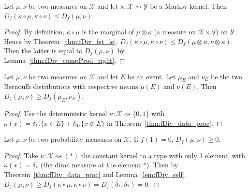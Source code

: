 \begin{theorem}
  \label{thm:fDiv_data_proc}
  Let $\mu, \nu$ be two measures on $\mathcal X$ and let $\kappa : \mathcal X \rightsquigarrow \mathcal Y$ be a Markov kernel.
  Then $D_f(\kappa \circ \mu, \kappa \circ \nu) \le D_f(\mu, \nu)$.
\end{theorem}

\begin{proof}
By definition, $\kappa \circ \mu$ is the marginal of $\mu \otimes \kappa$ (a measure on $\mathcal X \times \mathcal Y$) on $\mathcal Y$. Hence by Theorem~\ref{thm:fDiv_fst_le}, $D_f(\kappa \circ \mu, \kappa \circ \nu) \le D_f(\mu \otimes \kappa, \nu \otimes \kappa)$. Then the latter is equal to $D_f(\mu, \nu)$ by Lemma~\ref{thm:fDiv_compProd_right}.
\end{proof}

\begin{corollary}
  \label{cor:data_proc_event}
  Let $\mu, \nu$ be two measures on $\mathcal X$ and let $E$ be an event. Let $\mu_E$ and $\nu_E$ be the two Bernoulli distributions with respective means $\mu(E)$ and $\nu(E)$. Then $D_f(\mu, \nu) \ge D_f(\mu_E, \nu_E)$.
\end{corollary}

\begin{proof}
Use the deterministic kernel $\kappa : \mathcal X \rightsquigarrow \{0, 1\}$ with $\kappa(x) = \delta_1 \mathbb{I}\{x \in E\} + \delta_0 \mathbb{I}\{x \notin E\}$ in Theorem~\ref{thm:fDiv_data_proc}.
\end{proof}

\begin{lemma}
  \label{lem:fDiv_nonneg}
  Let $\mu, \nu$ be two probability measures on $\mathcal X$. If $f(1) = 0$, $D_f(\mu, \nu) \ge 0$.
\end{lemma}

\begin{proof}

Take $\kappa : \mathcal X \rightsquigarrow (*)$ the constant kernel to a type with only 1 element, with $\kappa(x) = \delta_*$ (the dirac measure at the element $*$).
Then by Theorem~\ref{thm:fDiv_data_proc} and Lemma~\ref{lem:fDiv_self}, $D_f(\mu, \nu) \ge D_f(\kappa \circ \mu, \kappa \circ \nu) = D_f(\delta_*, \delta_*) = 0$.
\end{proof}

